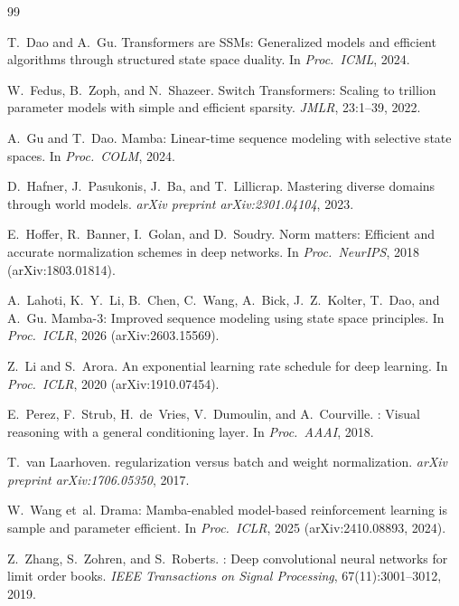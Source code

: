 \documentclass{article}
\begin{document}

\begin{thebibliography}{99}

T.~Dao and A.~Gu.
\newblock Transformers are {SSMs}: Generalized models and efficient algorithms through structured state space duality.
\newblock In \emph{Proc.\ ICML}, 2024.

W.~Fedus, B.~Zoph, and N.~Shazeer.
\newblock Switch {T}ransformers: Scaling to trillion parameter models with simple and efficient sparsity.
\newblock \emph{JMLR}, 23:1--39, 2022.

A.~Gu and T.~Dao.
\newblock Mamba: Linear-time sequence modeling with selective state spaces.
\newblock In \emph{Proc.\ COLM}, 2024.

D.~Hafner, J.~Pasukonis, J.~Ba, and T.~Lillicrap.
\newblock Mastering diverse domains through world models.
\newblock \emph{arXiv preprint arXiv:2301.04104}, 2023.

E.~Hoffer, R.~Banner, I.~Golan, and D.~Soudry.
\newblock Norm matters: Efficient and accurate normalization schemes in deep networks.
\newblock In \emph{Proc.\ NeurIPS}, 2018 (arXiv:1803.01814).

A.~Lahoti, K.~Y.~Li, B.~Chen, C.~Wang, A.~Bick, J.~Z.~Kolter, T.~Dao, and A.~Gu.
\newblock Mamba-3: Improved sequence modeling using state space principles.
\newblock In \emph{Proc.\ ICLR}, 2026 (arXiv:2603.15569).

Z.~Li and S.~Arora.
\newblock An exponential learning rate schedule for deep learning.
\newblock In \emph{Proc.\ ICLR}, 2020 (arXiv:1910.07454).

E.~Perez, F.~Strub, H.~de~Vries, V.~Dumoulin, and A.~Courville.
: Visual reasoning with a general conditioning layer.
\newblock In \emph{Proc.\ AAAI}, 2018.

T.~van Laarhoven.
 regularization versus batch and weight normalization.
\newblock \emph{arXiv preprint arXiv:1706.05350}, 2017.

W.~Wang et~al.
\newblock Drama: Mamba-enabled model-based reinforcement learning is sample and parameter efficient.
\newblock In \emph{Proc.\ ICLR}, 2025 (arXiv:2410.08893, 2024).

Z.~Zhang, S.~Zohren, and S.~Roberts.
: Deep convolutional neural networks for limit order books.
\newblock \emph{IEEE Transactions on Signal Processing}, 67(11):3001--3012, 2019.

\end{thebibliography}
\end{document}
